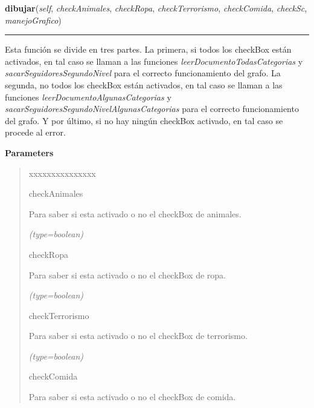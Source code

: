 \hspace{.8\funcindent}\begin{boxedminipage}{\funcwidth}

    \raggedright \textbf{dibujar}(\textit{self}, \textit{checkAnimales}, \textit{checkRopa}, \textit{checkTerrorismo}, \textit{checkComida}, \textit{checkSc}, \textit{manejoGrafico})

    \vspace{-1.5ex}

    \rule{\textwidth}{0.5\fboxrule}
\setlength{\parskip}{2ex}
    Esta función se divide en tres partes. La primera, si todos los 
    checkBox están activados, en tal caso se llaman a las funciones 
    \textit{leerDocumentoTodasCategorias} y 
    \textit{sacarSeguidoresSegundoNivel} para el correcto funcionamiento 
    del grafo. La segunda, no todos los checkBox están activados, en tal 
    caso se llaman a las funciones \textit{leerDocumentoAlgunasCategorias} 
    y \textit{sacarSeguidoresSegundoNivelAlgunasCategorias} para el 
    correcto funcionamiento del grafo. Y por último, si no hay ningún 
    checkBox activado, en tal caso se procede al error.

\setlength{\parskip}{1ex}
      \textbf{Parameters}
      \vspace{-1ex}

      \begin{quote}
        \begin{Ventry}{xxxxxxxxxxxxxxx}

          \item[checkAnimales]

          Para saber si esta activado o no el checkBox de animales.

            {\it (type=boolean)}

          \item[checkRopa]

          Para saber si esta activado o no el checkBox de ropa.

            {\it (type=boolean)}

          \item[checkTerrorismo]

          Para saber si esta activado o no el checkBox de terrorismo.

            {\it (type=boolean)}

          \item[checkComida]

          Para saber si esta activado o no el checkBox de comida.


\end{Ventry}
\end{quote}
\end{boxedminipage}
